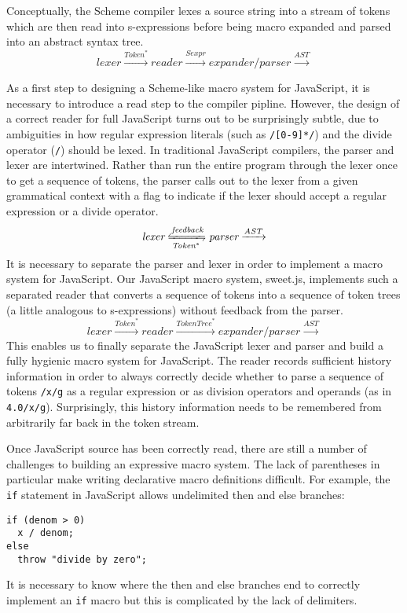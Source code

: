 \documentclass[preprint,10pt]{sigplanconf}
\begin{document}

Conceptually, the Scheme compiler lexes a source string into
a stream of tokens which are then read into s-expressions
before being macro expanded and parsed into an abstract syntax tree.
\[
\textit{lexer} \xrightarrow{\textit{Token}^{*}}
\textit{reader} \xrightarrow{\textit{Sexpr}}
\textit{expander/parser} \xrightarrow{\textit{AST}}
\]

As a first step to designing a Scheme-like macro system for
JavaScript, it is necessary to introduce a read step to the compiler
pipline. However, the design of a correct reader for full JavaScript
turns out to be surprisingly subtle, due to ambiguities in how regular
expression literals (such as \verb!/[0-9]*/!) and the divide
operator (\verb!/!) should be lexed. In traditional JavaScript
compilers, the parser and lexer are intertwined. Rather than run the
entire program through the lexer once to get a sequence of tokens, the
parser calls out to the lexer from a given grammatical context with a
flag to indicate if the lexer should accept a regular expression or
a divide operator.
\[
\textit{lexer} \xleftrightharpoons[\textit{Token}^{*}]{\textit{feedback}}
\textit{parser} \xrightarrow{\textit{AST}}
\]
It is necessary to separate the parser and lexer in order to implement
a macro system for JavaScript. Our JavaScript macro system,
sweet.js, implements such a separated
reader that converts a sequence of tokens into a sequence of token
trees (a little analogous to s-expressions) without feedback from the
parser.
\[
\textit{lexer} \xrightarrow{\textit{Token}^{*}}
\textit{reader} \xrightarrow{\textit{TokenTree}^{*}}
\textit{expander/parser} \xrightarrow{\textit{AST}}
\]
This enables us to finally separate the JavaScript lexer and parser
and build a fully hygienic macro system for JavaScript.
The reader records sufficient history information in order to always
correctly decide whether to parse a sequence of tokens
\verb!/x/g! as a regular expression or as division operators and
operands (as in \verb!4.0/x/g!). Surprisingly, this history
information needs to be remembered from arbitrarily far back in the
token stream.


Once JavaScript source has been correctly read, there are still a
number of challenges to building an expressive macro system. The lack
of parentheses in particular make writing declarative macro
definitions difficult. For example, the \verb!if! statement in
JavaScript allows undelimited then and else branches:
\begin{lstlisting}
if (denom > 0)
  x / denom;
else
  throw "divide by zero";
\end{lstlisting}
It is necessary to know where the then and else branches end to
correctly implement an \verb!if! macro but this is complicated by
the lack of delimiters. 
\end{document}
